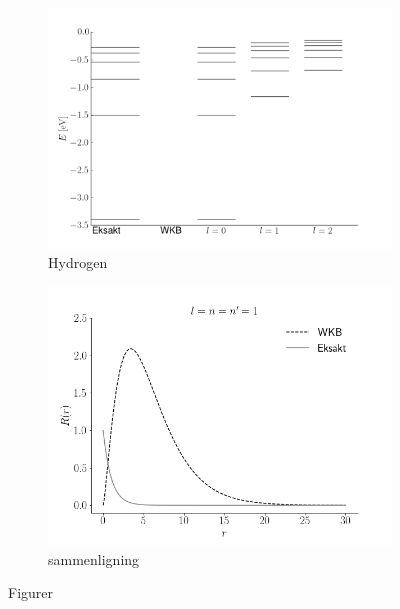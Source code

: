 \begin{figure}[h!]
    \centering
    \begin{subfigure}{0.45\columnwidth}
        \centering
        \includegraphics[width=\columnwidth]{energyPlot}
        \caption{Hydrogen}
        \label{fig:hydrogen}
    \end{subfigure}
    \begin{subfigure}{0.45\columnwidth}
        \centering
        \includegraphics[width=\columnwidth]{sammenligning}
        \caption{sammenligning}
        \label{fig:sammenligning}
    \end{subfigure}
    \caption{Figurer}
    \label{bigfig}
\end{figure}


%
